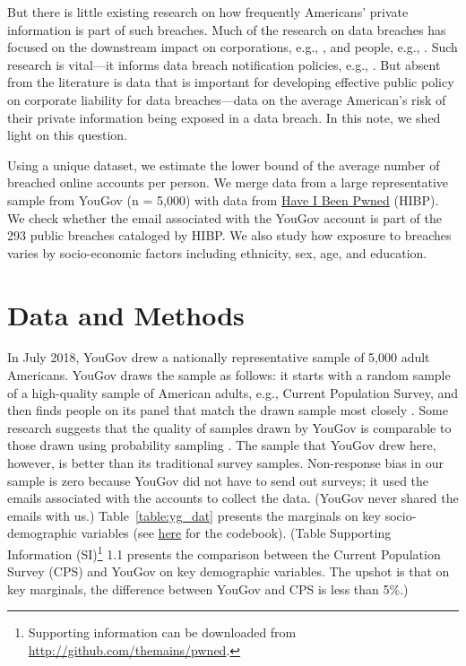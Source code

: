 \documentclass[sigconf]{acmart}
\begin{document}
But there is little existing research on how frequently Americans' private information is part of such breaches. Much of the research on data breaches has focused on the downstream impact on corporations, e.g., \cite{whitler2017impact, rosati2019social, janakiraman2018effect}, and people, e.g., \cite{cross2019media, mikhed2018data, curtis2018consumer}. Such research is vital---it informs data breach notification policies, e.g., \cite{nieuwesteeg2018analysis, marcus2018data, kuhn2018147}. But absent from the literature is data that is important for developing effective public policy on corporate liability for data breaches---data on the average American's risk of their private information being exposed in a data breach. In this note, we shed light on this question. 

Using a unique dataset, we estimate the lower bound of the average number of breached online accounts per person. We merge data from a large representative sample from YouGov (n = 5,000) with data from \href{https://haveibeenpwned.com}{Have I Been Pwned} (HIBP). We check whether the email associated with the YouGov account is part of the 293 public breaches cataloged by HIBP. We also study how exposure to breaches varies by socio-economic factors including ethnicity, sex, age, and education.

\section{Data and Methods}
In July 2018, YouGov drew a nationally representative sample of 5,000 adult Americans. YouGov draws the sample as follows: it starts with a random sample of a high-quality sample of American adults, e.g., Current Population Survey, and then finds people on its panel that match the drawn sample most closely \cite{rivers}. Some research suggests that the quality of samples drawn by YouGov is comparable to those drawn using probability sampling \cite{ansolabehere}. The sample that YouGov drew here, however, is better than its traditional survey samples. Non-response bias in our sample is zero because YouGov did not have to send out surveys; it used the emails associated with the accounts to collect the data. (YouGov never shared the emails with us.) Table~\ref{table:yg_dat} presents the marginals on key socio-demographic variables (see \href{https://github.com/themains/pwned/tree/master/data}{here} for the codebook). (Table Supporting Information (SI)\footnote{Supporting information can be downloaded from \url{http://github.com/themains/pwned}.} 1.1 presents the comparison between the Current Population Survey (CPS) and YouGov on key demographic variables. The upshot is that on key marginals, the difference between YouGov and CPS is less than 5\%.)
\end{document}
